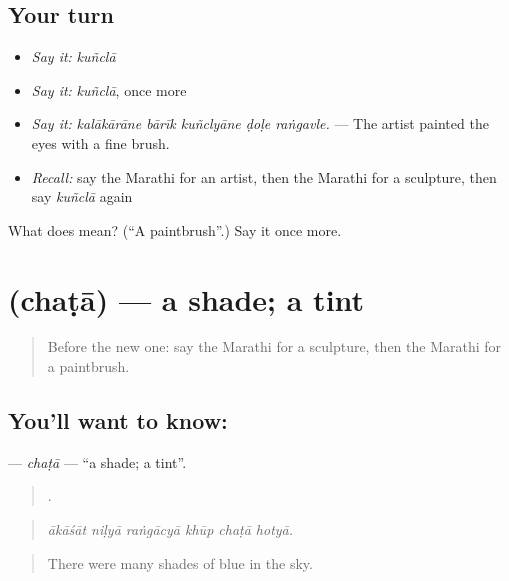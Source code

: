 \subsection*{Your turn}
\begin{itemize}
\raggedright
  \item \emph{Say it:} \emph{kuñclā}
  \item \emph{Say it:} \emph{kuñclā}, once more
  \item \emph{Say it:} \emph{kalākārāne bārīk kuñclyāne ḍoḷe raṅgavle.} — The artist painted the eyes with a fine brush.
  \item \emph{Recall:} say the Marathi for an artist, then the Marathi for a sculpture, then say \emph{kuñclā} again
\end{itemize}

\begin{tcolorbox}[breakable,colback=teal!4,colframe=teal!35!black,title={Before you move on}]
What does  mean? (\textquotedblleft{}A paintbrush\textquotedblright{}.) Say it once more.
\end{tcolorbox}
\section[\texorpdfstring{\mr{छटा} (chaṭā)}{छटा (chaṭā)}]{ (chaṭā) — a shade; a tint}

\label{lesson:MR-C535-chata}



\begin{quote}
Before the new one: say the Marathi for a sculpture, then the Marathi for a paintbrush.
\end{quote}

\subsection*{You'll want to know: }
\textbf{} — \emph{chaṭā} — \textquotedblleft{}a shade; a tint\textquotedblright{}.

\begin{quote}
     .
\end{quote}

\begin{quote}
\emph{ākāśāt niḷyā raṅgācyā khūp chaṭā hotyā.}
\end{quote}

\begin{quote}
There were many shades of blue in the sky.
\end{quote}

